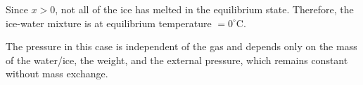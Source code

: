 Since \( x > 0 \), not all of the ice has melted in the equilibrium state. Therefore, the ice-water mixture is at equilibrium temperature \( = 0^\circ \text{C} \).  

The pressure in this case is independent of the gas and depends only on the mass of the water/ice, the weight, and the external pressure, which remains constant without mass exchange.